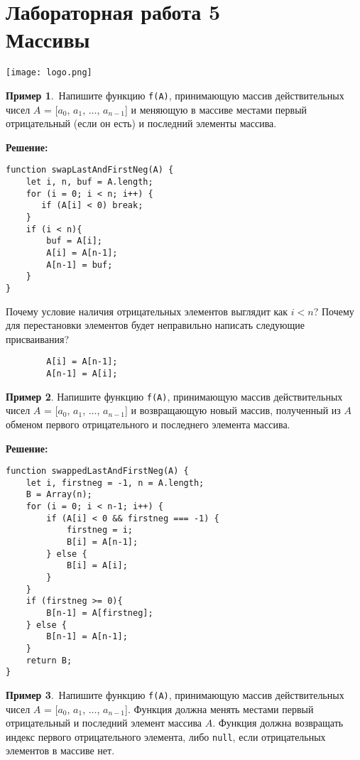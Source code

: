 \documentclass{article}
\begin{document}
\section*{{\normalsize Лабораторная работа 5} \\ Массивы}

\noindent\vskip-18mm
\null\hfill\texttt{[image: logo.png]}
\newline

{\bf Пример 1}.~Напишите функцию \texttt{f(A)}, принимающую массив действительных чисел $A$ = [$a_0$, $a_1$, $\ldots$, $a_{n-1}$] и меняющую в массиве местами первый отрицательный (если он есть) и последний элементы массива.

\smallskip\noindent\textbf{Решение:}

\begin{verbatim}
function swapLastAndFirstNeg(A) {
    let i, n, buf = A.length;
    for (i = 0; i < n; i++) {
       if (A[i] < 0) break;
    }
    if (i < n){
        buf = A[i];
        A[i] = A[n-1];
        A[n-1] = buf;
    }
}
\end{verbatim}

\noindent Почему условие наличия отрицательных элементов выглядит как $i<n$? Почему для перестановки элементов будет неправильно написать следующие присваивания?
\begin{verbatim}
        A[i] = A[n-1]; 
        A[n-1] = A[i];
\end{verbatim}

{\bf Пример 2}. Напишите функцию \texttt{f(A)}, принимающую массив действительных чисел $A$ = [$a_0$, $a_1$, $\ldots$, $a_{n-1}$] и возвращающую новый массив, полученный из $A$ обменом первого отрицательного и последнего элемента массива.

\smallskip\noindent\textbf{Решение:}
\begin{verbatim}
function swappedLastAndFirstNeg(A) {
    let i, firstneg = -1, n = A.length;
    B = Array(n);
    for (i = 0; i < n-1; i++) {
        if (A[i] < 0 && firstneg === -1) {
            firstneg = i;
            B[i] = A[n-1];
        } else {
            B[i] = A[i];
        }
    }
    if (firstneg >= 0){
        B[n-1] = A[firstneg];
    } else {
        B[n-1] = A[n-1];
    }
    return B;
}
\end{verbatim}

{\bf Пример 3}.~Напишите функцию \texttt{f(A)}, принимающую массив действительных чисел $A$ = [$a_0$, $a_1$, $\ldots$, $a_{n-1}$]. Функция должна менять местами первый отрицательный и последний элемент массива $A$. Функция должна возвращать индекс первого отрицательного элемента, либо \texttt{null}, если отрицательных элементов в массиве нет. 
\end{document}
